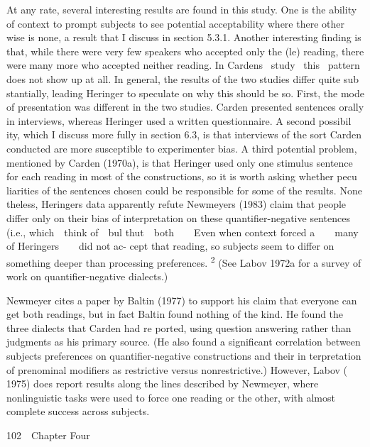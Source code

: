 \begin{styleStandard}
At any rate, several interesting results are found in this study. One is the ability of context to prompt subjects to see potential acceptability where there other\- wise is none, a result that I discuss in section 5.3.1. Another interesting finding is that, while there were very few speakers who accepted only the (le) reading, there were many more who accepted neither reading. In Carden{\textquotesingle}s \ study \ this \ pattern does not show up at all. In general, the results of the two studies differ quite sub\- stantially, leading Heringer to speculate on why this should be so. First, the mode of presentation was different in the two studies. Carden presented sentences orally in interviews, whereas Heringer used a written questionnaire. A second possibil\- ity, which I discuss more fully in section 6.3, is that interviews of the sort Carden conducted are more susceptible to experimenter bias. A third potential problem, mentioned by Carden (1970a), is that Heringer used only one stimulus sentence for each reading in most of the constructions, so it is worth asking whether pecu\- liarities of the sentences chosen could be responsible for some of the results. None\- theless, Heringer{\textquotesingle}s data apparently refute Newmeyer{\textquotesingle}s (1983) claim that people differ only on their bias of interpretation on these quantifier-negative sentences (i.e., which\ \ think of\ \ bul thut\ \ both\ \ \ \ Even when context forced a\ \ \ \ many of Heringer{\textquotesingle}s\ \ \ \ did not ac- cept that reading, so subjects seem to differ on something deeper than processing preferences. \textsuperscript{2}\textsuperscript{ }(See Labov 1972a for a survey of work on quantifier-negative dialects.)
\end{styleStandard}


\begin{listWWNumxliileveli}
\item 
\setcounter{listWWNumxliilevelii}{0}
\begin{listWWNumxliilevelii}
\item 
\begin{styleStandard}
Newmeyer cites a paper by Baltin (1977) to support his claim that everyone can get both readings, but in fact Baltin found nothing of the kind. He found the three dialects that Carden had re\- ported, using question answering rather than judgments as his primary source. (He also found a significant correlation between subjects{\textquotesingle} preferences on quantifier-negative constructions and their in\- terpretation of prenominal modifiers as restrictive versus nonrestrictive.) However, Labov ( 1975) does report results along the lines described by Newmeyer, where nonlinguistic tasks were used to force one reading or the other, with almost complete success across subjects.
\end{styleStandard}


\end{listWWNumxliilevelii}
\end{listWWNumxliileveli}
\clearpage\setcounter{page}{1}\begin{styleStandard}
102\ \ Chapter Four
\end{styleStandard}


